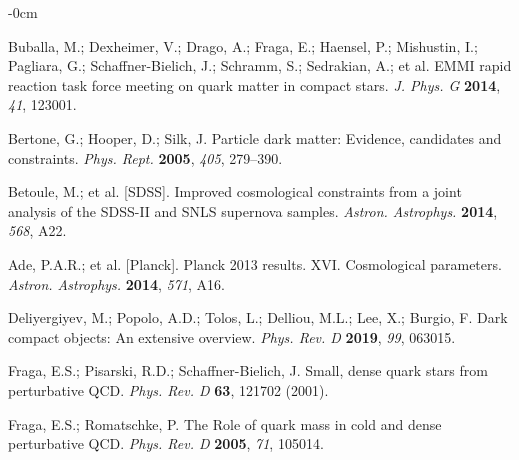 \documentclass[universe,article,accept,moreauthors,pdftex]{Definitions/mdpi}
\begin{document}
\begin{adjustwidth}{-\extralength}{0cm}
\begin{thebibliography}{999}
Buballa, M.; Dexheimer, V.; Drago, A.; Fraga, E.; Haensel, P.; Mishustin, I.; Pagliara, G.; Schaffner-Bielich, J.; Schramm, S.; Sedrakian, A.; {et al.}
EMMI rapid reaction task force meeting on quark matter in compact stars. 
\emph{J. Phys. G} \textbf{2014}, \emph{41}, 123001.

Bertone, G.; Hooper, D.; Silk, J. 
Particle dark matter: Evidence, candidates and constraints. 
\emph{Phys. Rept.} \textbf{2005}, \emph{405}, 279--390. 

Betoule, M.; {et al.} {[SDSS].} 
Improved cosmological constraints from a joint analysis of the SDSS-II and SNLS supernova samples. 
{\emph{Astron. Astrophys.}}  \textbf{2014}, \emph{568},  A22.

Ade, P.A.R.; {et al.} [Planck]. 
Planck 2013 results. XVI. Cosmological parameters. 
\emph{Astron. Astrophys.} \textbf{2014}, {\emph{571}}, A16.

Deliyergiyev, M.; Popolo, A.D.; Tolos, L.; Delliou, M.L.; Lee, X.; Burgio, F. 
Dark compact objects: An extensive overview. 
\emph{Phys. Rev. D}  \textbf{2019}, \emph{99}, 063015. 

Fraga, E.S.; Pisarski, R.D.; Schaffner-Bielich, J. 
Small, dense quark stars from perturbative QCD. 
\emph{Phys. Rev. D}  \textbf{63}, 121702 (2001).

Fraga, E.S.; Romatschke, P. 
The Role of quark mass in cold and dense perturbative QCD. 
\emph{Phys. Rev. D} \textbf{2005}, {\emph{71}}, 105014.


\end{thebibliography}
\end{adjustwidth}
\end{document}
